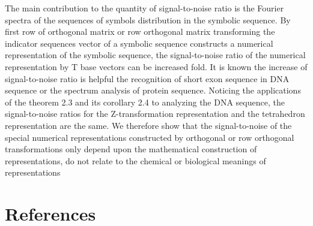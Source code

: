 \documentclass[preprint,authoryear,12pt]{elsarticle}
\begin{document}
The main contribution to the quantity of signal-to-noise ratio is the Fourier spectra of the sequences of symbols distribution in the symbolic sequence. By first  row of orthogonal matrix or row orthogonal matrix transforming the indicator sequences vector of a symbolic sequence constructs a numerical representation of the symbolic sequence, the signal-to-noise ratio of the numerical representation by T base vectors can be increased fold. It is known the increase of signal-to-noise ratio is helpful the recognition of short exon sequence in DNA sequence or the spectrum analysis of protein sequence. Noticing the applications of the theorem 2.3 and its corollary 2.4 to analyzing the DNA sequence, the signal-to-noise ratios for the Z-transformation representation and the tetrahedron representation are the same. We therefore show that the signal-to-noise of the special numerical representations constructed by orthogonal or row orthogonal transformations only depend upon the mathematical construction of representations, do not relate to the chemical or biological meanings of representations
\small

























\section*{References}






\end{document}
